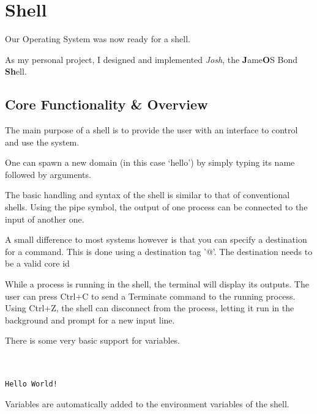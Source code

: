 \section{Shell} \label{shell}

Our Operating System was now ready for a shell.

As my personal project, I designed and implemented \emph{Josh}, the \textbf{J}ame\textbf{O}S Bond \textbf{Sh}ell.


\subsection{Core Functionality \& Overview}
The main purpose of a shell is to provide the user with an interface to control and use the system.

One can spawn a new domain (in this case `hello') by simply typing its name followed by arguments.
\begin{mdframed}[style=shell]
\end{mdframed}

The basic handling and syntax of the shell is similar to that of conventional shells. Using the pipe
symbol, the output of one process can be connected to the input of another one.
\begin{mdframed}[style=shell]
\end{mdframed}

A small difference to most systems however is that you can specify a destination for a command.
This is done using a destination tag '@'. The destination needs to be a valid core id
\begin{mdframed}[style=shell]
\end{mdframed}

While a process is running in the shell, the terminal will display its outputs. The user
can press Ctrl+C to send a Terminate command to the running process. Using Ctrl+Z,
the shell can disconnect from the process, letting it run in the background and prompt
for a new input line.


There is some very basic support for variables.
\begin{mdframed}[style=shell]
\\
\\
\texttt{Hello World!}
\end{mdframed}

Variables are automatically added to the environment variables of the shell.

